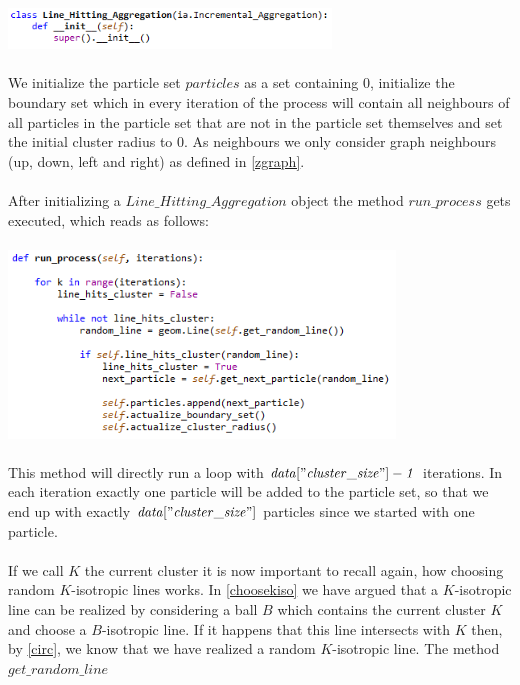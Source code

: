 \documentclass[12pt,a4paper]{scrartcl}
\newcommand{\1}{\mathbbm{1}}
\theoremstyle{definition}
\numberwithin{equation}{section}
\begin{document}
\\
\includegraphics[height=1.1cm]{images/code-snippets/lhainit.png} \\
\\
We initialize the particle set $\mathit{particles}$ as a set containing $0$, initialize the boundary set which in every iteration of the process will contain all neighbours of all particles in the particle set that are not in the particle set themselves and set the initial cluster radius to $0$. As neighbours we only consider graph neighbours (up, down, left and right) as defined in \ref{zgraph}. \\
\\After initializing a $\mathit{Line\_Hitting\_Aggregation}$ object the method $\mathit{run\_process}$ gets executed, which reads as follows: \\
\\
\includegraphics[height=5cm]{images/code-snippets/runprocess.png} \\
\\
This method will directly run a loop with $\mathit{data["cluster\_size"] - 1}$ iterations. In each iteration exactly one particle will be added to the particle set, so that we end up with exactly $\mathit{data["cluster\_size"]}$ particles since we started with one particle. \\
\\If we call $K$ the current cluster it is now important to recall again, how choosing random $K$-isotropic lines works. In \ref{choosekiso} we have argued that a $K$-isotropic line can be realized by considering a ball $B$ which contains the current cluster $K$ and choose a $B$-isotropic line. If it happens that this line intersects with $K$ then, by \ref{circ}, we know that we have realized a random $K$-isotropic line. The method $\mathit{get\_random\_line}$ \\
\end{document}
